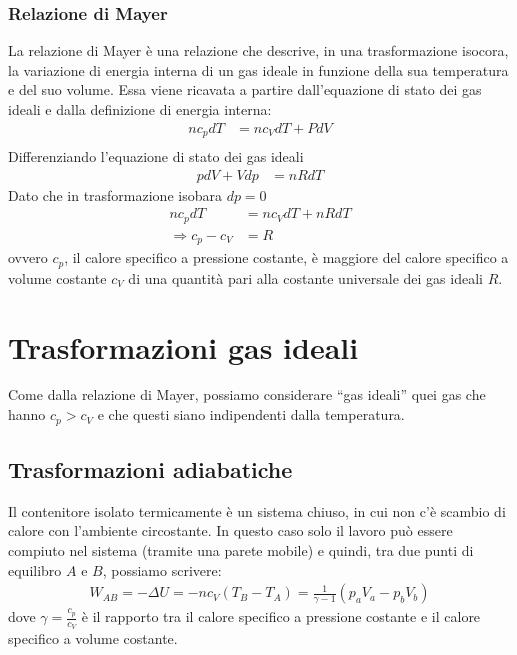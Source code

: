         \subsubsection{Relazione di Mayer}
            La relazione di Mayer è una relazione che descrive, in una trasformazione isocora, la variazione di energia interna di un gas ideale in funzione della sua temperatura e del suo volume. Essa viene ricavata a partire dall'equazione di stato dei gas ideali e dalla definizione di energia interna:
            \begin{align*}
                nc_pdT &= nc_VdT + P dV \\
            \end{align*}
            Differenziando l'equazione di stato dei gas ideali
            \begin{align*}
                pdV + Vdp &= nRdT
            \end{align*}
            Dato che in trasformazione isobara $dp=0$ 
            \begin{align}
                nc_pdT &= nc_VdT + nRdT\\
                \Rightarrow c_p - c_V &= R \label{eq:relazione_mayer}
            \end{align}
            ovvero $c_p$, il calore specifico a pressione costante, è maggiore del calore specifico a volume costante $c_V$ di una quantità pari alla costante universale dei gas ideali $R$. 
\section{Trasformazioni gas ideali}
    Come dalla relazione di Mayer, possiamo considerare ``gas ideali'' quei gas che hanno $c_p>c_V$ e che questi siano indipendenti dalla temperatura.
    \subsection{Trasformazioni adiabatiche}
        Il contenitore isolato termicamente è un sistema chiuso, in cui non c'è scambio di calore con l'ambiente circostante. In questo caso solo il lavoro può essere compiuto nel sistema (tramite una parete mobile) e quindi, tra due punti di equilibro $A$ e $B$, possiamo scrivere:
        \begin{align}
            W_{AB}=-\Delta U = -nc_V(T_B-T_A)=\frac{1}{\gamma-1}(p_aV_a-p_bV_b)
        \end{align}
        dove $\gamma=\frac{c_p}{c_V}$ è il rapporto tra il calore specifico a pressione costante e il calore specifico a volume costante.
